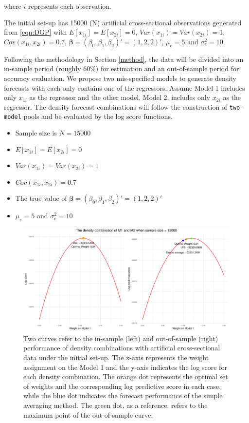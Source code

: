 \documentclass{monashthesis}
\begin{document}
where \(i\) represents each observation.

The initial set-up has 15000 (N) artificial cross-sectional observations generated from \ref{eqn:DGP} with \(E[x_{1i}] = E[x_{2i}] = 0\), \(Var(x_{1i}) = Var(x_{2i}) = 1\), \(Cov(x_{1i}, x_{2i}) = 0.7\), \(\pmb{\beta} = (\beta_0, \beta_1, \beta_2)' = (1,2,2)'\), \(\mu_e = 5\) and \(\sigma^2_e=10\).

Following the methodology in Section \ref{method}, the data will be divided into an in-sample period (roughly 60\%) for estimation and an out-of-sample period for accuracy evaluation. We propose two mis-specified models to generate density forecasts with each only contains one of the regressors. Assume Model 1 includes only \(x_{1i}\) as the regressor and the other model, Model 2, includes only \(x_{2i}\) as the regressor. The density forecast combinations will follow the construction of \texttt{two-model} pools and be evaluated by the log score functions.

\begin{itemize}
\item
  Sample size is \(N=15000\)
\item
  \(E[x_{1i}] = E[x_{2i}] = 0\)
\item
  \(Var(x_{1i}) = Var(x_{2i}) = 1\)
\item
  \(Cov(x_{1i}, x_{2i}) = 0.7\)
\item
  The true value of \(\pmb{\beta} = (\beta_0, \beta_1, \beta_2)' = (1,2,2)'\)
\item
  \(\mu_e = 5\) and \(\sigma^2_e=10\)
\end{itemize}

\begin{figure}[ht]
\centering
\includegraphics[scale=0.6]{figures/Sample_Size_15000.pdf}
\caption{Two curves refer to the in-sample (left) and out-of-sample (right) performance of density combinations with artificial cross-sectional data under the initial set-up. The x-axis represents the weight assignment on the Model 1 and the y-axis indicates the log score for each density combination. The orange dot represents the optimal set of weights and the corresponding log predictive score in each case, while the blue dot indicates the forecast performance of the simple averaging method. The green dot, as a reference, refers to the maximum point of the out-of-sample curve.}
\label{fig:ss15000}
\end{figure}
\end{document}
